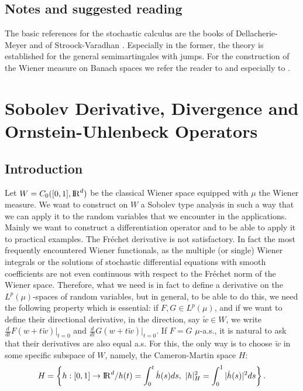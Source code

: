 \documentclass[12pt,a4paper]{book}
\newcommand{\R}{{\rm I\!R}}
\begin{document}
\section*{Notes and suggested reading}
{\footnotesize{The basic references for the stochastic calculus
  are  the books of Dellacherie-Meyer \cite{D-M} and of
  Stroock-Varadhan \cite{S-V}. Especially in the former, the theory is
  established  for the general semimartingales with jumps. For the
  construction of  the Wiener measure on Banach spaces we refer the reader to
  \cite{LG-1} and especially to \cite{KUO}.
}}




\chapter{Sobolev Derivative, Divergence and Ornstein-Uhlenbeck
  Operators}
\label{ch.deriv}

\setcounter{section}{0}

\section{Introduction}

Let $W=C_0([0,1],\R^d)$ be the classical Wiener space equipped  with $\mu$
the Wiener
measure. We want to construct on $W$ a Sobolev type analysis in such a way that
we can apply it to the random variables that we encounter in the applications.
Mainly we want to construct a differentiation operator and to be able to apply
it to practical examples. The Fr\'echet derivative is not satisfactory. In fact
the most frequently encountered Wiener functionals, as the multiple
(or single) Wiener integrals or the solutions of stochastic
differential equations with smooth coefficients are not even
continuous with respect to the Fr\'echet norm of the Wiener
space. Therefore, what we need is in fact to define a derivative on
the
$L^p(\mu)$-spaces of random variables, but in general, to be able to do this,
we need the following  property which is essential: if
$F,G\in L^p(\mu)$, and if we want
to define their directional derivative, in the direction, say $\tilde{w}\in W$,
we write $\frac{d}{dt}F(w+t\tilde{w})|_{t=0}$ and
$\frac{d}{dt}G(w+t\tilde{w})|_{t=0}$. If $F=G$ $\mu$-a.s., it is
natural to ask that
their derivatives are also equal a.s. For this, the only way is to choose
$\tilde{w}$ in some specific subspace of $W$, namely, the Cameron-Martin space
$H$:
$$
H=\left\{h:[0,1]\to\R^d/h(t)= \int_0^t\dot{h}(s)ds,\,\,
|h|_{H}^2=\int_0^1|\dot{h}(s)|^2 ds\right\}.
$$
\end{document}
